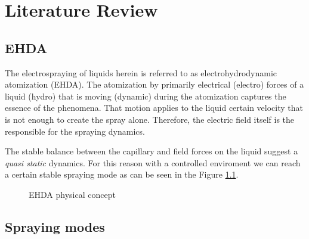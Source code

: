 \chapter{Literature Review}
\label{chap:lit_review}


\section{EHDA}
\label{sec:ehda_resume}

The electrospraying of liquids herein is referred to as electrohydrodynamic atomization (EHDA). The atomization by primarily electrical (electro) forces of a liquid (hydro) that is moving (dynamic) during the atomization captures the essence of the phenomena.\cite{Grace}
That motion applies to the liquid certain velocity that is not enough to create the spray alone. Therefore, the electric field itself is the responsible for the spraying dynamics.\cite{prunet}

The stable balance between the capillary and field forces on the liquid suggest a \emph{quasi static} dynamics.
For this reason with a controlled enviroment we can reach a certain stable spraying mode as can be seen in the Figure \ref{fig:ehda_setup_ex2}.

\begin{figure}[H]
  \centering
  \caption{EHDA physical concept \cite{Gabriel}}
  \label{fig:ehda_setup_ex2}
\end{figure}


\section{Spraying modes}
\label{sec:spraying_modes_subsec}

